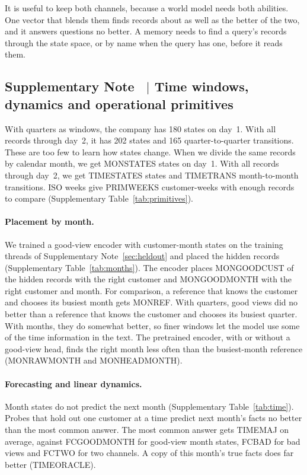 \documentclass[11pt]{article}
\newcounter{suppnote}
\newcommand{\suppnote}[2]{\refstepcounter{suppnote}\label{#2}\subsection{Supplementary Note \thesuppnote\ $|$ #1}}
\begin{document}
It is useful to keep both channels, because a world model needs both abilities. One vector that blends them finds records about as well as the better of the two, and it answers questions no better. A memory needs to find a query's records through the state space, or by name when the query has one, before it reads them.

\suppnote{Time windows, dynamics and operational primitives}{sec:time}
\label{sec:primitives}
With quarters as windows, the company has 180 states on day~1. With all records through day~2, it has 202 states and 165 quarter-to-quarter transitions. These are too few to learn how states change. When we divide the same records by calendar month, we get MONSTATES states on day~1. With all records through day~2, we get TIMESTATES states and TIMETRANS month-to-month transitions. ISO weeks give PRIMWEEKS customer-weeks with enough records to compare (Supplementary Table~\ref{tab:primitives}).

\paragraph{Placement by month.} We trained a good-view encoder with customer-month states on the training threads of Supplementary Note~\ref{sec:heldout} and placed the hidden records (Supplementary Table~\ref{tab:months}). The encoder places MONGOODCUST of the hidden records with the right customer and MONGOODMONTH with the right customer and month. For comparison, a reference that knows the customer and chooses its busiest month gets MONREF. With quarters, good views did no better than a reference that knows the customer and chooses its busiest quarter. With months, they do somewhat better, so finer windows let the model use some of the time information in the text. The pretrained encoder, with or without a good-view head, finds the right month less often than the busiest-month reference (MONRAWMONTH and MONHEADMONTH).

\paragraph{Forecasting and linear dynamics.} Month states do not predict the next month (Supplementary Table~\ref{tab:time}). Probes that hold out one customer at a time predict next month's facts no better than the most common answer. The most common answer gets TIMEMAJ on average, against FCGOODMONTH for good-view month states, FCBAD for bad views and FCTWO for two channels. A copy of this month's true facts does far better (TIMEORACLE).
\end{document}
